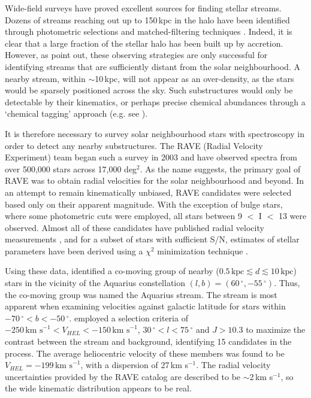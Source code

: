 \documentclass{emulateapj}
\begin{document}

Wide-field surveys have proved excellent sources for finding stellar streams. Dozens of streams reaching out up to 150\,kpc in the halo have been identified through photometric selections and matched-filtering techniques \citep{belokurov;et-al_2007,koposov_SG1}. Indeed, it is clear that a large fraction of the stellar halo has been built up by accretion. However, as \citet{helmi;white_1999} point out, these observing strategies are only successful for identifying streams that are sufficiently distant from the solar neighbourhood. A nearby stream, within $\sim$10\,kpc, will not appear as an over-density, as the stars would be sparsely positioned across the sky. Such substructures would only be detectable by their kinematics, or perhaps precise chemical abundances through a `chemical tagging' approach (e.g. see \citet{freeman;bland-hawthorn_2003}). 

It is therefore necessary to survey solar neighbourhood stars with spectroscopy in order to detect any nearby substructures. The RAVE (Radial Velocity Experiment) team began such a survey in 2003 and have observed spectra from over 500,000 stars across 17,000 deg$^{2}$. As the name suggests, the primary goal of RAVE was to obtain radial velocities for the solar neighbourhood and beyond. In an attempt to remain kinematically unbiased, RAVE candidates were selected based only on their apparent magnitude. With the exception of bulge stars, where some photometric cuts were employed, all stars between 9 $<$ I $<$ 13 were observed. Almost all of these candidates have published radial velocity measurements \citep{steinmetz;et-al_2006}, and for a subset of stars with sufficient S/N, estimates of stellar parameters have been derived using a $\chi^2$ minimization technique \citep{zwitter;et-al_2008, siebert;et-al_2011}. 

Using these data, \citet{williams;et-al_2011} identified a co-moving group of nearby ($0.5\,\mbox{kpc} \lesssim d \lesssim 10\,\mbox{kpc}$) stars in the vicinity of the Aquarius constellation $(l, b) = (60\,^\circ, -55\,^\circ)$. Thus, the co-moving group was named the Aquarius stream. The stream is most apparent when examining velocities against galactic latitude for stars within $-70\,^\circ < b < -50\,^\circ$. \citet{williams;et-al_2011} employed a selection criteria of $-250\,\mbox{km s}^{-1} < V_{HEL} < -150\,\mbox{km s}^{-1}$, $30\,^\circ < l < 75\,^\circ$ and $J > 10.3$ to maximize the contrast between the stream and background, identifying 15 candidates in the process. The average heliocentric velocity of these members was found to be $V_{HEL} = -199\,\mbox{km s}^{-1}$, with a dispersion of 27\,km s$^{-1}$. The radial velocity uncertainties provided by the RAVE catalog are described to be $\sim$2\,km s$^{-1}$, so the wide kinematic distribution appears to be real.
\end{document}
